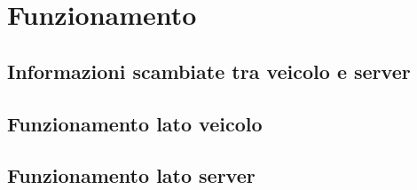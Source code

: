 \section{Funzionamento}
\subsection{Informazioni scambiate tra veicolo e server}
\subsection{Funzionamento lato veicolo}
\subsection{Funzionamento lato server}
